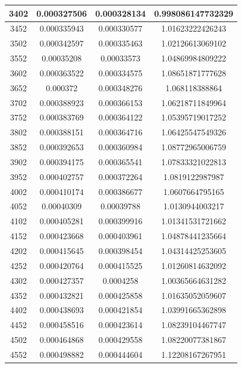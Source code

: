 \documentclass{article}
\begin{document}
\begin{longtable}{|c|c|c|c|}
		3402	&   0.000327506	  & 0.000328134	 &  0.998086147732329   \\ \hline
		3452	&   0.000335943	  & 0.000330577	 &  1.01623222426243   \\ \hline
		3502	&   0.000342597	  & 0.000335463	 &  1.02126613069102   \\ \hline
		3552	&   0.00035208	  & 0.00033573	 &  1.04869984809222   \\ \hline
		3602	&   0.000363522	  & 0.000334575	 &  1.08651871777628   \\ \hline
		3652	&   0.000372	  & 0.000348276	 &  1.068118388864   \\ \hline
		3702	&   0.000388923	  & 0.000366153	 &  1.06218711849964   \\ \hline
		3752	&   0.000383769	  & 0.000364122	 &  1.05395719017252   \\ \hline
		3802	&   0.000388151	  & 0.000364716	 &  1.06425547549326   \\ \hline
		3852	&   0.000392653	  & 0.000360984	 &  1.08772965006759   \\ \hline
		3902	&   0.000394175	  & 0.000365541	 &  1.07833321022813   \\ \hline
		3952	&   0.000402757	  & 0.000372264	 &  1.0819122987987   \\ \hline
		4002	&   0.000410174	  & 0.000386677	 &  1.0607664795165   \\ \hline
		4052	&   0.00040309	  & 0.00039788	 &  1.0130944003217   \\ \hline
		4102	&   0.000405281	  & 0.000399916	 &  1.01341531721662   \\ \hline
		4152	&   0.000423668	  & 0.000403961	 &  1.04878441235664   \\ \hline
		4202	&   0.000415645	  & 0.000398454	 &  1.04314425253605   \\ \hline
		4252	&   0.000420764	  & 0.000415525	 &  1.01260814632092   \\ \hline
		4302	&   0.000427357	  & 0.0004258	 &  1.00365664631282   \\ \hline
		4352	&   0.000432821	  & 0.000425858	 &  1.01635052059607   \\ \hline
		4402	&   0.000438693	  & 0.000421854	 &  1.03991665362898   \\ \hline
		4452	&   0.000458516	  & 0.000423614	 &  1.08239104467747   \\ \hline
		4502	&   0.000464868	  & 0.000429558	 &  1.08220077381867   \\ \hline
		4552	&   0.000498882	  & 0.000444604	 &  1.12208167267951   \\ \hline

\end{longtable}
\end{document}
